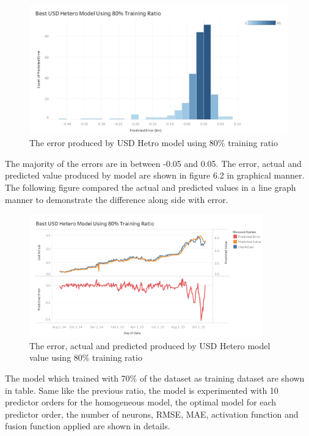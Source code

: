 {{{{{	\begin{figure}[hbt!]\centering
		\includegraphics[width=1\textwidth]{hetro_usd_80}
		\caption{The error produced by USD Hetro model using 80\% training ratio}
	\end{figure}
	\pagebreak
	
	The majority of the errors are in between -0.05 and 0.05. The error, actual and predicted value produced by model are shown in figure 6.2  in graphical manner. The following figure compared the actual and predicted values in a line graph manner to demonstrate the difference along side with error.
	
	
	\begin{figure}[hbt!]\centering
		\includegraphics[width=0.9\textwidth]{best_usd_hetero_APV_80}
		\caption{The error, actual and predicted produced by USD Hetero model  value using 80\% training ratio }
	\end{figure}
	\pagebreak
	
	
	The model which trained with 70\% of the dataset as training dataset are shown in table. Same like the previous ratio, the model is  experimented with 10 predictor orders for the homogeneous model, the optimal model for each predictor order, the number of neurons, RMSE, MAE, activation function and fusion function applied are shown in details.
	
}}}}}
